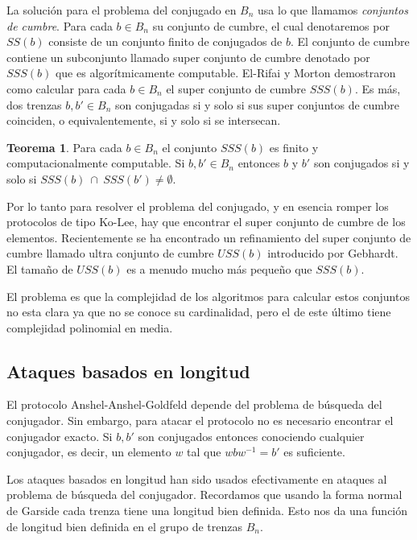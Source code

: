 \documentclass[12pt]{book}
\theoremstyle{definition}
\newtheorem{teor}{Teorema}[section]
\begin{document}
La solución para el problema del conjugado en $B_n$ usa lo que llamamos \textit{conjuntos de cumbre}. Para cada $b\in B_n$ su conjunto de cumbre, el cual denotaremos por $SS(b)$ consiste de un conjunto finito de conjugados de $b$. El conjunto de cumbre contiene un subconjunto llamado super conjunto de cumbre denotado por $SSS(b)$ que es algorítmicamente computable. El-Rifai y Morton demostraron como calcular para cada $b\in B_n$ el super conjunto de cumbre $SSS(b)$. Es más, dos trenzas $b,b'\in B_n$ son conjugadas si y solo si sus super conjuntos de cumbre coinciden, o equivalentemente, si y solo si se intersecan.

\begin{teor}
Para cada $b\in B_n$ el conjunto $SSS(b)$ es finito y computacionalmente computable. Si $b,b'\in B_n$ entonces $b$ y $b'$ son conjugados si y solo si $SSS(b)\ \cap\ SSS(b')\neq \emptyset$.
\end{teor}

Por lo tanto para resolver el problema del conjugado, y en esencia romper los protocolos de tipo Ko-Lee, hay que encontrar el super conjunto de cumbre de los elementos. Recientemente se ha encontrado un refinamiento del super conjunto de cumbre llamado ultra conjunto de cumbre $USS(b)$ introducido por Gebhardt. El tamaño de $USS(b)$ es a menudo mucho más pequeño que $SSS(b)$.

El problema es que la complejidad de los algoritmos para calcular estos conjuntos no esta clara ya que no se conoce su cardinalidad, pero el de este último tiene complejidad polinomial en media.

\subsection{Ataques basados en longitud}
El protocolo Anshel-Anshel-Goldfeld depende del problema de búsqueda del conjugador. Sin embargo, para atacar el protocolo no es necesario encontrar el conjugador exacto. Si $b,b'$ son conjugados entonces conociendo cualquier conjugador, es decir, un elemento $w$ tal que $wbw^{-1}=b'$ es suficiente.

Los ataques basados en longitud han sido usados efectivamente en ataques al problema de búsqueda del conjugador. Recordamos que usando la forma normal de Garside cada trenza tiene una longitud bien definida. Esto nos da una función de longitud bien definida en el grupo de trenzas $B_n$.
\end{document}

